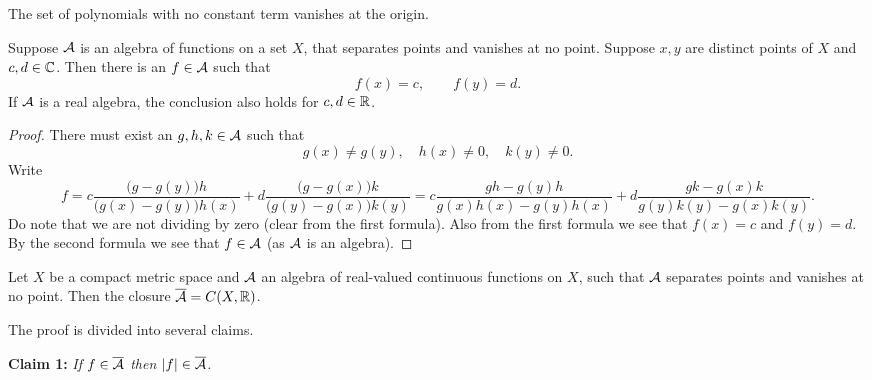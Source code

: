 \begin{example}
The set of polynomials with no constant term vanishes at the origin.
\end{example}

\begin{prop} \label{prop:SWinterpolate}
Suppose ${\mathcal{A}}$ is an algebra of functions on a set $X$, that separates points
and vanishes at no point.  Suppose $x,y$ are distinct points of $X$ and
$c,d \in {\mathbb{C}}$.  Then there is an $f \in {\mathcal{A}}$ such that
\begin{equation*}
f(x) = c, \qquad f(y) = d .
\end{equation*}
If ${\mathcal{A}}$ is a real algebra, the conclusion also holds for $c,d \in {\mathbb{R}}$.
\end{prop}

\begin{proof}
There must exist an $g,h,k \in {\mathcal{A}}$
such that 
\begin{equation*}
g(x) \not= g(y), \quad h(x) \not= 0, \quad k(y) \not= 0 .
\end{equation*}
Write
\begin{equation*}
f = 
c
\frac{\bigl(g - g(y)\bigr)h}{\bigl(g(x)-g(y)\bigr)h(x) } + 
d
\frac{\bigl(g - g(x)\bigr)k}{\bigl(g(y)-g(x)\bigr)k(y)}
=
c
\frac{gh - g(y)h}{g(x)h(x)-g(y)h(x) } + 
d
\frac{gk - g(x)k}{g(y)k(y)-g(x)k(y)} .
\end{equation*}
Do note that we are not dividing by zero (clear from the first formula).
Also from the first formula we see that $f(x) = c$ and $f(y) = d$.
By the second formula we see that $f \in {\mathcal{A}}$ (as ${\mathcal{A}}$ is an algebra).
\end{proof}

\begin{thm}
\label{thm:SWreal}
Let $X$ be a compact metric space and ${\mathcal{A}}$ an algebra of real-valued
continuous functions on $X$, such that ${\mathcal{A}}$ separates points and vanishes at
no point.  Then the closure $\overline{{\mathcal{A}}} = C(X,{\mathbb{R}})$.
\end{thm}

The proof is divided into several claims.

\medskip

\noindent
\textbf{Claim 1:} \emph{If $f \in \overline{{\mathcal{A}}}$ then $\lvert {f} \rvert \in
\overline{{\mathcal{A}}}$.}

